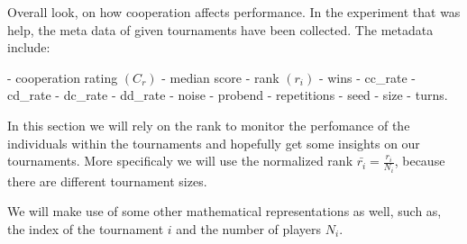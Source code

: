Overall look, on how cooperation affects performance. In the experiment that was help,
the meta data of given tournaments have been collected. The metadata include:

- cooperation rating $(C_{r})$
- median score
- rank $(r_{i})$
- wins
- cc_rate
- cd_rate
- dc_rate
- dd_rate
- noise
- probend
- repetitions
- seed
- size
- turns.

In this section we will rely on the rank to monitor the perfomance of the individuals within the tournaments and hopefully get some insights on our tournaments. More specificaly we will use the normalized rank $\bar{r_{i}} = \frac{r_{i}}{N_{i}}$, because there are different tournament sizes.

We will make use of some other mathematical representations as well, such as, the
index of the tournament $i$ and the number of players $N_{i}$. 

